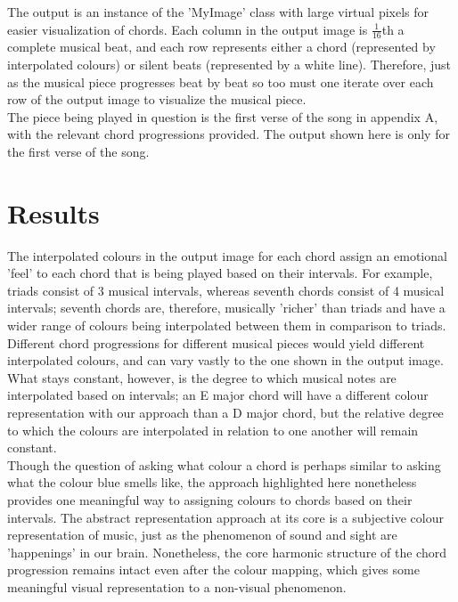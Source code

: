 \documentclass{article}
\begin{document}
The output is an instance of the 'MyImage' class with large virtual pixels for easier visualization of chords. Each column in the output image is $\frac{1}{16}$th a complete musical beat, and each row represents either a chord (represented by interpolated colours) or silent beats (represented by a white line). Therefore, just as the musical piece progresses beat by beat so too must one iterate over each row of the output image to visualize the musical piece.\\

The piece being played in question is the first verse of the song in appendix A, with the relevant chord progressions provided. The output shown here is only for the first verse of the song.

\section{Results}

The interpolated colours in the output image for each chord assign an emotional 'feel' to each chord that is being played based on their intervals. For example, triads consist of 3 musical intervals, whereas seventh chords consist of 4 musical intervals; seventh chords are, therefore, musically 'richer' than triads and have a wider range of colours being interpolated between them in comparison to triads.\\

Different chord progressions for different musical pieces would yield different interpolated colours, and can vary vastly to the one shown in the output image. What stays constant, however, is the degree to which musical notes are interpolated based on intervals; an E major chord will have a different colour representation with our approach than a D major chord, but the relative degree to which the colours are interpolated in relation to one another will remain constant.\\

Though the question of asking what colour a chord is perhaps similar to asking what the colour blue smells like, the approach highlighted here nonetheless provides one meaningful way to assigning colours to chords based on their intervals. The abstract representation approach at its core is a subjective colour representation of music, just as the phenomenon of sound and sight are 'happenings' in our brain. Nonetheless, the core harmonic structure of the chord progression remains intact even after the colour mapping, which gives some meaningful visual representation to a non-visual phenomenon.\\
\end{document}
